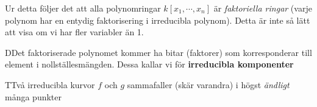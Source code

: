 \par\bigskip
\noindent Ur detta följer det att alla polynomringar $k[x_1,\cdots,x_n]$ är \textit{faktoriella ringar} (varje polynom har en entydig faktorisering i irreducibla polynom). Detta är inte så lätt att visa om vi har fler variabler än 1.
\par\bigskip
\begin{theo}
  DDet faktoriserade polynomet kommer ha bitar (faktorer) som korresponderar till element i nollställesmängden. Dessa kallar vi för \textbf{irreducibla komponenter}
\end{theo}
\par\bigskip
\begin{theo}
  TTvå irreducibla kurvor $f$ och $g$ sammafaller (skär varandra) i högst \textit{ändligt} många punkter
\end{theo}
